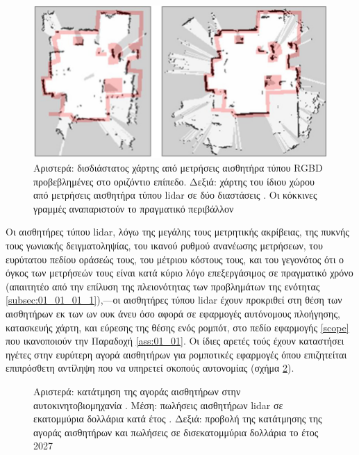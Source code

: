 \begin{figure}\centering
  \includegraphics[scale=0.5]{./figures/parts/01/chapters/01/sections/01/rgbd_lidar_map.png}
  \caption{\small Αριστερά: δισδιάστατος χάρτης από μετρήσεις αισθητήρα τύπου
           RGBD προβεβλημένες στο οριζόντιο επίπεδο. Δεξιά: χάρτης του ίδιου
           χώρου από μετρήσεις αισθητήρα τύπου lidar σε δύο διαστάσεις
           \cite{Oliver2012}. Οι κόκκινες γραμμές αναπαριστούν το πραγματικό
           περιβάλλον}
  \label{fig:rgbd_lidar_map}
\end{figure}

Οι αισθητήρες τύπου lidar, λόγω της μεγάλης τους μετρητικής ακρίβειας, της
πυκνής τους γωνιακής δειγματοληψίας, του ικανού ρυθμού ανανέωσης μετρήσεων, του
ευρύτατου πεδίου οράσεώς τους, του μέτριου κόστους τους, και του γεγονότος ότι
ο όγκος των μετρήσεών τους είναι κατά κύριο λόγο επεξεργάσιμος σε πραγματικό
χρόνο (απαιτητέο από την επίλυση της πλειονότητας των προβλημάτων της ενότητας
\ref{subsec:01_01_01_1}),---οι αισθητήρες τύπου lidar έχουν προκριθεί στη θέση
των αισθητήρων εκ των ων ουκ άνευ όσο αφορά σε εφαρμογές αυτόνομους πλοήγησης,
κατασκευής χάρτη, και εύρεσης της θέσης ενός ρομπότ, στο πεδίο εφαρμογής
\ref{scope} που ικανοποιούν την Παραδοχή \ref{ass:01_01}. Οι ίδιες αρετές τούς
έχουν καταστήσει ηγέτες στην ευρύτερη αγορά αισθητήρων για ρομποτικές εφαρμογές
όπου επιζητείται επιπρόσθετη αντίληψη που να υπηρετεί σκοπούς αυτονομίας (σχήμα
\ref{fig:lidar_share}).


\begin{figure}\centering
  
  \caption{\small Αριστερά: κατάτμηση της αγοράς αισθητήρων στην
           αυτοκινητοβιομηχανία \cite{Sighencea2021}. Μέση: πωλήσεις αισθητήρων
           lidar σε εκατομμύρια δολλάρια κατά έτος \cite{statista1}. Δεξιά:
           προβολή της κατάτμησης της αγοράς αισθητήρων και πωλήσεις σε
           δισεκατομμύρια δολλάρια το έτος 2027 \cite{statista2}}
  \label{fig:lidar_share}
\end{figure}


